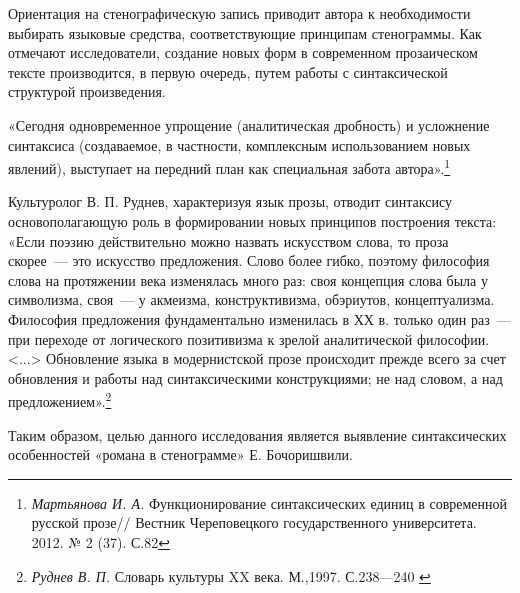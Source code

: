 \documentclass{kursa4}
\begin{document}
    Ориентация на стенографическую запись приводит автора к
    необходимости выбирать языковые средства, соответствующие принципам
    стенограммы. Как отмечают исследователи, создание новых форм в
    современном прозаическом тексте производится, в первую очередь, путем
    работы с синтаксической структурой произведения. 

    {«Сегодня одновременное упрощение (аналитическая
    дробность) и усложнение синтаксиса (создаваемое, в частности,
    комплексным использованием новых явлений), выступает на передний план
    как специальная забота
    автора».}\footnote{\textit{{Мартьянова И. А.
    }}{Функционирование синтаксических единиц в
    современной русской прозе// Вестник Череповецкого государственного университета. 2012. № 2 (37). С.82}}

    {Культуролог В. П. Руднев, характеризуя язык прозы,
    отводит синтаксису основополагающую роль в формировании новых принципов
    построения текста: «Если поэзию действительно можно назвать
    искусством слова, то проза скорее~--- это искусство предложения. Слово
    более гибко, поэтому философия слова на протяжении века изменялась
    много раз: своя концепция слова была у символизма, своя~--- у акмеизма,
    конструктивизма, обэриутов, концептуализма. Философия предложения
    фундаментально изменилась в ХХ в. только один раз~--- при переходе от
    логического позитивизма к зрелой аналитической философии.
    \textless{}...\textgreater{} Обновление языка в модернистской прозе
    происходит прежде всего за счет обновления и работы над
    синтаксическими конструкциями; не над словом, а над
    предложением».}\footnote{\textit{{ Руднев В. П.
    }}{Словарь культуры XX века. М.,1997. С.238—240 }}

    {Таким образом, целью данного исследования является
    выявление синтаксических особенностей «романа в стенограмме» Е.
    Бочоришвили.}
\end{document}
